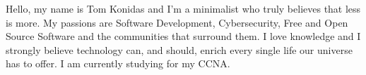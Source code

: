 \documentclass[9pt]{developercv} %
\begin{document}
\vspace{0.5cm}



\begin{minipage}[t]{0.4\textwidth} %
	\vspace{-\baselineskip} %
	
  Hello, my name is Tom Konidas and I'm a minimalist who truly believes that less is more. 
  My passions are Software Development, Cybersecurity, Free and Open Source Software and the communities that surround them.
  I love knowledge and I strongly believe technology can, and should, enrich every single 
  life our universe has to offer.
  I am currently studying for my CCNA.
\end{minipage}
\hfill %
\begin{minipage}[t]{0.5\textwidth} %
	\vspace{-\baselineskip} %
	\begin{barchart}{5.5}
	\end{barchart}
\end{minipage}


\end{document}
